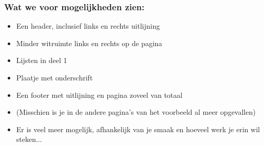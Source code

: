 \documentclass{cursuspresentatie}
\begin{document}
\begin{frame}
	\frametitle{Wat we voor mogelijkheden zien:}
	\begin{itemize}
		\item Een header, inclusief links en rechts uitlijning
		\item Minder witruimte links en rechts op de pagina
		\item Lijsten in deel 1
		\item Plaatje met onderschrift
		\item Een footer met uitlijning en pagina zoveel van totaal
		\item (Misschien is je in de andere pagina's van het voorbeeld al meer opgevallen)
		\item Er is veel meer mogelijk, afhankelijk van je smaak en hoeveel werk je erin wil steken...
	\end{itemize}
\end{frame}
\end{document}
